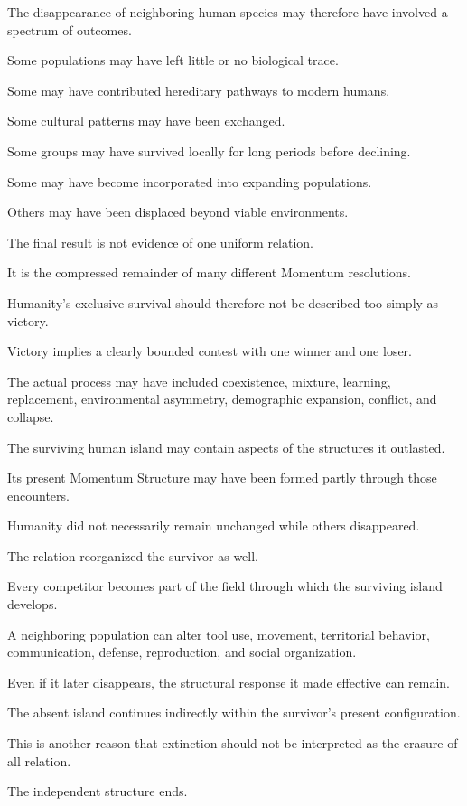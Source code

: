 The disappearance of neighboring human species may therefore have involved a spectrum of outcomes.

Some populations may have left little or no biological trace.

Some may have contributed hereditary pathways to modern humans.

Some cultural patterns may have been exchanged.

Some groups may have survived locally for long periods before declining.

Some may have become incorporated into expanding populations.

Others may have been displaced beyond viable environments.

The final result is not evidence of one uniform relation.

It is the compressed remainder of many different Momentum resolutions.

Humanity’s exclusive survival should therefore not be described too simply as victory.

Victory implies a clearly bounded contest with one winner and one loser.

The actual process may have included coexistence, mixture, learning, replacement, environmental asymmetry, demographic expansion, conflict, and collapse.

The surviving human island may contain aspects of the structures it outlasted.

Its present Momentum Structure may have been formed partly through those encounters.

Humanity did not necessarily remain unchanged while others disappeared.

The relation reorganized the survivor as well.

Every competitor becomes part of the field through which the surviving island develops.

A neighboring population can alter tool use, movement, territorial behavior, communication, defense, reproduction, and social organization.

Even if it later disappears, the structural response it made effective can remain.

The absent island continues indirectly within the survivor’s present configuration.

This is another reason that extinction should not be interpreted as the erasure of all relation.

The independent structure ends.

